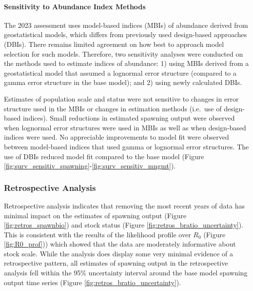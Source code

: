 \documentclass[11pt,
  english,
  letterpaper,
]{article}
\begin{document}
\hypertarget{sensitivity-to-abundance-index-methods}{%
\paragraph{Sensitivity to Abundance Index Methods}\label{sensitivity-to-abundance-index-methods}}

The 2023 assessment uses model-based indices (MBIs) of abundance derived from geostatistical models, which differs from previously used design-based approaches (DBIs). There remains limited agreement on how best to approach model selection for such models. Therefore, two sensitivity analyses were conducted on the methods used to estimate indices of abundance: 1) using MBIs derived from a geostatistical model that assumed a lognormal error structure (compared to a gamma error structure in the base model); and 2) using newly calculated DBIs.

Estimates of population scale and status were not sensitive to changes in error structure used in the MBIs or changes in estimation methods (i.e.~use of design-based indices). Small reductions in estimated spawning output were observed when lognormal error structures were used in MBIs as well as when design-based indices were used. No appreciable improvements to model fit were observed between model-based indices that used gamma or lognormal error structures. The use of DBIs reduced model fit compared to the base model (Figure \ref{fig:surv_sensitiv_spawning}-\ref{fig:surv_sensitiv_mngmt}).

\hypertarget{retrospective-analysis}{%
\subsubsection{Retrospective Analysis}\label{retrospective-analysis}}

Retrospective analysis indicates that removing the most recent years of data has minimal impact on the estimates of spawning output (Figure \ref{fig:retros_spawnbio}) and stock status (Figure \ref{fig:retros_bratio_uncertainty}). This is consistent with the results of the likelihood profile over \(R_0\) (Figure \ref{fig:R0_prof})) which showed that the data are moderately informative about stock scale. While the analysis does display some very minimal evidence of a retrospective pattern, all estimates of spawning output in the retrospective analysis fell within the 95\% uncertainty interval around the base model spawning output time series (Figure \ref{fig:retros_bratio_uncertainty}).
\end{document}
